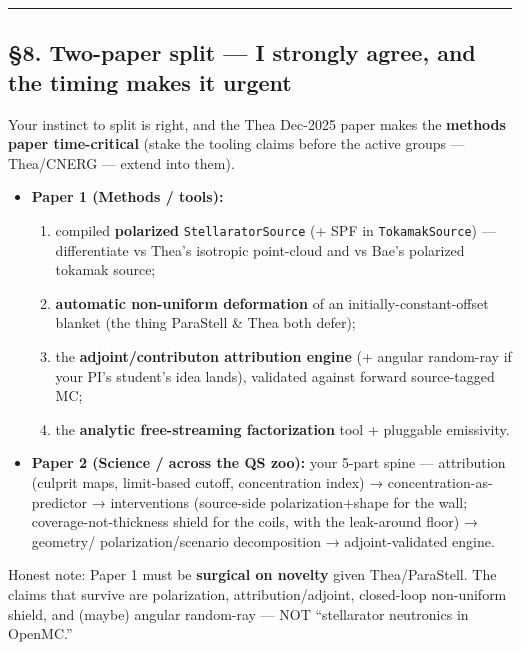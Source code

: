 \documentclass[
]{article}
\providecommand{\tightlist}{%
  \setlength{\itemsep}{0pt}\setlength{\parskip}{0pt}}
\begin{document}
\begin{center}\rule{0.5\linewidth}{0.5pt}\end{center}

\subsection{§8. Two-paper split --- I strongly agree, and the timing
makes it
urgent}\label{two-paper-split-i-strongly-agree-and-the-timing-makes-it-urgent}

Your instinct to split is right, and the Thea Dec-2025 paper makes the
\textbf{methods paper time-critical} (stake the tooling claims before
the active groups --- Thea/CNERG --- extend into them).

\begin{itemize}
\tightlist
\item
  \textbf{Paper 1 (Methods / tools):}

  \begin{enumerate}
  \def\labelenumi{\arabic{enumi}.}
  \tightlist
  \item
    compiled \textbf{polarized} \texttt{StellaratorSource} (+ SPF in
    \texttt{TokamakSource}) --- differentiate vs Thea's isotropic
    point-cloud and vs Bae's polarized tokamak source;
  \item
    \textbf{automatic non-uniform deformation} of an
    initially-constant-offset blanket (the thing ParaStell \& Thea both
    defer);
  \item
    the \textbf{adjoint/contributon attribution engine} (+ angular
    random-ray if your PI's student's idea lands), validated against
    forward source-tagged MC;
  \item
    the \textbf{analytic free-streaming factorization} tool + pluggable
    emissivity.
  \end{enumerate}
\item
  \textbf{Paper 2 (Science / across the QS zoo):} your 5-part spine ---
  attribution (culprit maps, limit-based cutoff, concentration index) →
  concentration-as-predictor → interventions (source-side
  polarization+shape for the wall; coverage-not-thickness shield for the
  coils, with the leak-around floor) → geometry/ polarization/scenario
  decomposition → adjoint-validated engine.
\end{itemize}

Honest note: Paper 1 must be \textbf{surgical on novelty} given
Thea/ParaStell. The claims that survive are polarization,
attribution/adjoint, closed-loop non-uniform shield, and (maybe) angular
random-ray --- NOT ``stellarator neutronics in OpenMC.''
\end{document}
